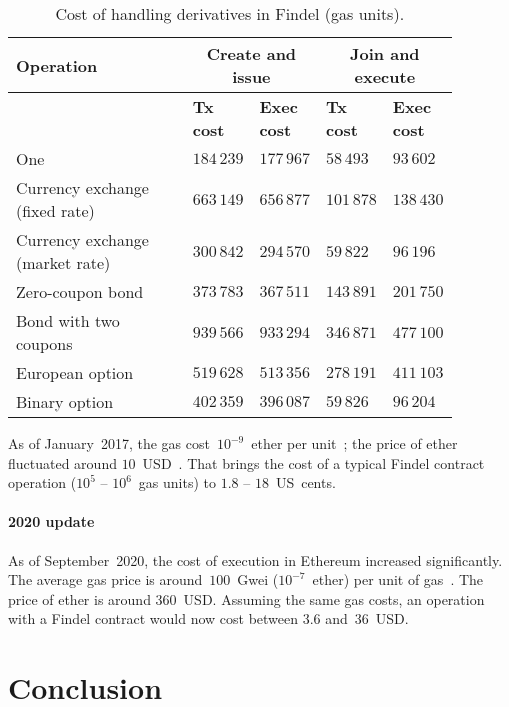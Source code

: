 \begin{table}
	\centering
	\caption{Cost of handling derivatives in Findel (gas units).}
	\begin{tabular}{|p{0.4\linewidth}|p{0.12\linewidth}|p{0.12\linewidth}|p{0.12\linewidth}|p{0.12\linewidth}|}
		\hline
		\textbf{Operation} & \multicolumn{2}{|c|}{\textbf{Create and issue}} & \multicolumn{2}{|c|}{\textbf{Join and execute}}\\
		\hline
		& \textbf{Tx cost} & \textbf{Exec cost} & \textbf{Tx cost} & \textbf{Exec cost} \\
		\hline
		One & $184\,239$ & $177\,967$ & $58\,493$ & $93\,602$ \\
		\hline
		Currency exchange (fixed rate) & $663\,149$ & $656\,877$ & $101\,878$ & $138\,430$ \\
		\hline
		Currency exchange (market rate) & $300\,842$ & $294\,570$ & $59\,822$ & $96\,196$ \\
		\hline
		Zero-coupon bond & $373\,783$ & $367\,511$ & $143\,891$ & $201\,750$ \\
		\hline
		Bond with two coupons & $939\,566$ & $933\,294$ & $346\,871$ & $477\,100$ \\
		\hline
		European option & $519\,628$ & $513\,356$ & $278\,191$ & $411\,103$ \\
		\hline
		Binary option & $402\,359$ & $396\,087$ & $59\,826$ & $96\,204$ \\
		\hline
	\end{tabular}
	\label{tab:Ch10FindelCost2}
\end{table}

As of January~2017, the gas cost~$10^{-9}$~ether per unit~\cite{Ethstats}; the price of ether fluctuated around $10$~USD~\cite{Worldcoinindex}.
That brings the cost of a typical Findel contract operation ($10^5$ -- $10^6$~gas units) to $1.8$ -- $18$~US~cents.

\paragraph{2020 update}
As of September~2020, the cost of execution in Ethereum increased significantly.
The average gas price is around~$100$~Gwei ($10^{-7}$~ether) per unit of gas~\cite{EGS}.
The price of ether is around $360$~USD.
Assuming the same gas costs, an operation with a Findel contract would now cost between $3.6$ and~$36$~USD.


\section{Conclusion}

